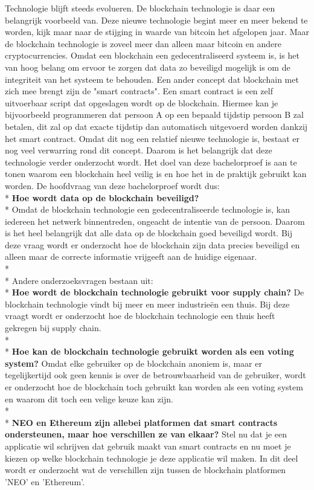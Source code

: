\documentclass[fleqn,10pt]{voorstel}
\begin{document}
Technologie blijft steeds evolueren. De blockchain technologie is daar een belangrijk voorbeeld van. Deze nieuwe technologie begint meer en meer bekend te worden, kijk maar naar de stijging in waarde van bitcoin het afgelopen jaar. Maar de blockchain technologie is zoveel meer dan alleen maar bitcoin en andere cryptocurrencies. Omdat een blockchain een gedecentraliseerd systeem is, is het van hoog belang om ervoor te zorgen dat data zo beveiligd mogelijk is om de integriteit van het systeem te behouden.
Een ander concept dat blockchain met zich mee brengt zijn de "smart contracts".
Een smart contract is een zelf uitvoerbaar script dat opgeslagen wordt op de blockchain. Hiermee kan je bijvoorbeeld programmeren dat persoon A op een bepaald tijdstip persoon B zal betalen, dit zal op dat exacte tijdstip dan automatisch uitgevoerd worden dankzij het smart contract. Omdat dit nog een relatief nieuwe technologie is, bestaat er nog veel verwarring rond dit concept. Daarom is het belangrijk dat deze technologie verder onderzocht wordt. Het doel van deze bachelorproef is aan te tonen waarom een blockchain heel veilig is en hoe het in de praktijk gebruikt kan worden. De hoofdvraag van deze bachelorproef wordt dus:\\*
\textbf{Hoe wordt data op de blockchain beveiligd?} \\*
Omdat de blockchain technologie een gedecentraliseerde technologie is, kan iedereen het netwerk binnentreden, ongeacht de intentie van de persoon. Daarom is het heel belangrijk dat alle data op de blockchain goed beveiligd wordt. Bij deze vraag wordt er onderzocht hoe de blockchain zijn data precies beveiligd en alleen maar de correcte informatie vrijgeeft aan de huidige eigenaar.\\*\\*
Andere onderzoeksvragen bestaan uit: \\*
\textbf{Hoe wordt de blockchain technologie gebruikt voor supply chain?}
De blockchain technologie vindt bij meer en meer industrieën een thuis. Bij deze vraagt wordt er onderzocht hoe de blockchain technologie een thuis heeft gekregen bij supply chain.\\*\\*
\textbf{Hoe kan de blockchain technologie gebruikt worden als een voting system?}
Omdat elke gebruiker op de blockchain anoniem is, maar er tegelijkertijd ook geen kennis is over de betrouwbaarheid van de gebruiker, wordt er onderzocht hoe de blockchain toch gebruikt kan worden als een voting system en waarom dit toch een velige keuze kan zijn. \\*\\*
\textbf{NEO en Ethereum zijn allebei platformen dat smart contracts ondersteunen, maar hoe verschillen ze van elkaar?} 
Stel nu dat je een applicatie wil schrijven dat gebruik maakt van smart contracts en nu moet je kiezen op welke blockchain technologie je deze applicatie wil maken. In dit deel wordt er onderzocht wat de verschillen zijn tussen de blockchain platformen 'NEO' en 'Ethereum'.
\end{document}
